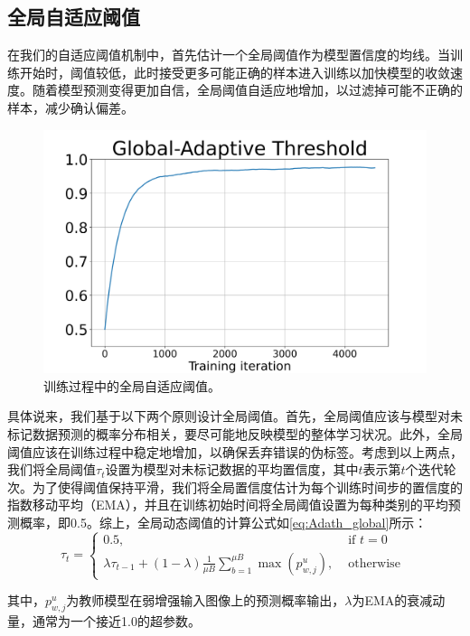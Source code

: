\documentclass[lang=chs, degree=master, blindreview=false, adobe=false]{yanputhesis}
\begin{document}
\subsection{全局自适应阈值}
在我们的自适应阈值机制中，首先估计一个全局阈值作为模型置信度的均线。当训练开始时，阈值较低，此时接受更多可能正确的样本进入训练以加快模型的收敛速度。随着模型预测变得更加自信，全局阈值自适应地增加，以过滤掉可能不正确的样本，减少确认偏差。
\begin{figure}[htb]
	\centering
	\includegraphics[scale=0.35]{images/adath_plot.png}
	\caption{
		训练过程中的全局自适应阈值。
	}
	\label{fig:AdaTh_frame}
\end{figure}
具体说来，我们基于以下两个原则设计全局阈值。首先，全局阈值应该与模型对未标记数据预测的概率分布相关，要尽可能地反映模型的整体学习状况。此外，全局阈值应该在训练过程中稳定地增加，以确保丢弃错误的伪标签。考虑到以上两点，我们将全局阈值$\tau_t$设置为模型对未标记数据的平均置信度，其中$t$表示第$t$个迭代轮次。为了使得阈值保持平滑，我们将全局置信度估计为每个训练时间步的置信度的指数移动平均（EMA），并且在训练初始时间将全局阈值设置为每种类别的平均预测概率，即0.5。综上，全局动态阈值的计算公式如\ref{eq:Adath_global}所示：
\begin{equation}
    \label{eq:Adath_global}
    \tau_{t}=\left\{\begin{array}{ll}
      0.5, & \text { if } t=0 \\
      \lambda \tau_{t-1}+(1-\lambda) \frac{1}{\mu B} \sum_{b=1}^{\mu B} \max \left(p_{w, j}^{u}\right), & \text { otherwise }
      \end{array}\right.
\end{equation}

其中，$p_{w, j}^{u}$为教师模型在弱增强输入图像上的预测概率输出，$\lambda$为EMA的衰减动量，通常为一个接近1.0的超参数。
\end{document}
